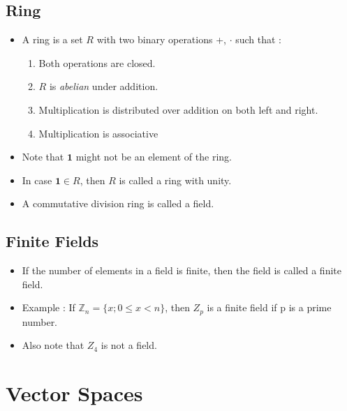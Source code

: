 \documentclass[twoside]{article}
\begin{document}
	\subsection{Ring}
	\begin{itemize}
		\item A ring is a set $R$ with two binary operations +, $\cdot$ such that :
		\begin{enumerate}
			\item Both operations are closed.
			\item $R$ is {\it abelian} under addition.
			\item Multiplication is distributed over addition on both left and right.
			\item Multiplication is associative
		\end{enumerate}
		\item Note that $\mathbf{1}$ might not be an element of the ring.
		\item In case $\mathbf{1} \in R$, then $R$ is called a ring with unity.
		\item A commutative division ring is called a field.
	\end{itemize}

	\subsection{Finite Fields}
	\begin{itemize}
		\item If the number of elements in a field is finite, then the field is called a finite field.
		\item Example : If $\mathbb{Z}_n = \{x ; 0 \leq x < n\}$, then $Z_p$ is a finite field if p is a prime number.
		\item Also note that $Z_4$ is not a field.
	\end{itemize}	
	
	\section{Vector Spaces}
\end{document}
